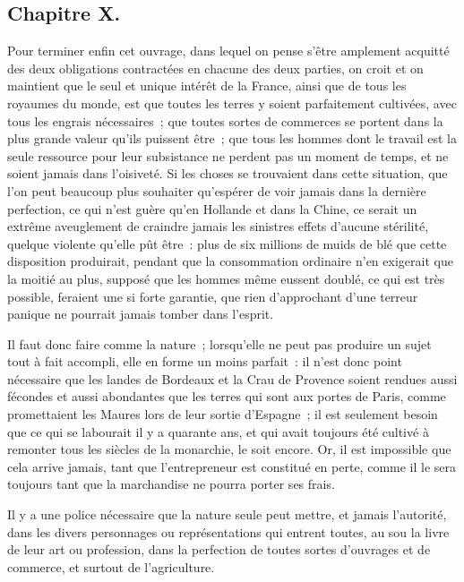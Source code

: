 \documentclass[french,twoside]{book} %
\begin{document}
\subsection[{Chapitre X.}]{Chapitre X.}
\noindent Pour terminer enfin cet ouvrage, dans lequel on pense s’être amplement acquitté des deux obligations contractées en chacune des deux parties, on croit et on maintient que le seul et unique intérêt de la France, ainsi que de tous les royaumes du monde, est que toutes les terres y soient parfaitement cultivées, avec tous les engrais nécessaires ; que toutes sortes de commerces se portent dans la plus grande valeur qu’ils puissent être ; que tous les hommes dont le travail est la seule ressource pour leur subsistance ne perdent pas un moment de temps, et ne soient jamais dans l’oisiveté. Si les choses se trouvaient dans cette situation, que l’on peut beaucoup plus souhaiter qu’espérer de voir jamais dans la dernière perfection, ce qui n’est guère qu’en Hollande et dans la Chine, ce serait un extrême aveuglement de craindre jamais les sinistres effets d’aucune stérilité, quelque violente qu’elle pût être : plus de six millions de muids de blé que cette disposition produirait, pendant que la consommation ordinaire n’en exigerait que la moitié au plus, supposé que les hommes même eussent doublé, ce qui est très possible, feraient une si forte garantie, que rien d’approchant d’une terreur panique ne pourrait jamais tomber dans l’esprit.\par
Il faut donc faire comme la nature ; lorsqu’elle ne peut pas produire un sujet tout à fait accompli, elle en forme un moins parfait : il n’est donc point nécessaire que les landes de Bordeaux et la Crau de Provence soient rendues aussi fécondes et aussi abondantes que les terres qui sont aux portes de Paris, comme promettaient les Maures lors de leur sortie d’Espagne ; il est seulement besoin que ce qui se labourait il y a quarante ans, et qui avait toujours été cultivé à remonter tous les siècles de la monarchie, le soit encore. Or, il est impossible que cela arrive jamais, tant que l’entrepreneur est constitué en perte, comme il le sera toujours tant que la marchandise ne pourra porter ses frais.\par
Il y a une police nécessaire que la nature seule peut mettre, et jamais l’autorité, dans les divers personnages ou représentations qui entrent toutes, au sou la livre de leur art ou profession, dans la perfection de toutes sortes d’ouvrages et de commerce, et surtout de l’agriculture.\par
\end{document}
